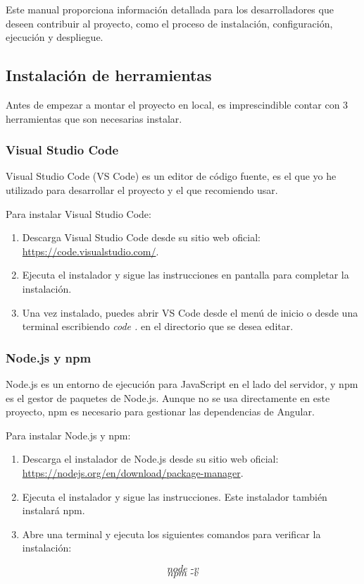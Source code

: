 Este manual proporciona información detallada para los desarrolladores que deseen contribuir al proyecto, como el proceso de instalación, configuración, ejecución y despliegue.

\subsection{Instalación de herramientas}

Antes de empezar a montar el proyecto en local, es imprescindible contar con 3 herramientas que son necesarias instalar.

\subsubsection{Visual Studio Code}
Visual Studio Code (VS Code) es un editor de código fuente, es el que yo he utilizado para desarrollar el proyecto y el que recomiendo usar.

Para instalar Visual Studio Code:
\begin{enumerate}
    \item Descarga Visual Studio Code desde su sitio web oficial: \url{https://code.visualstudio.com/}.
    \item Ejecuta el instalador y sigue las instrucciones en pantalla para completar la instalación.
    \item Una vez instalado, puedes abrir VS Code desde el menú de inicio o desde una terminal escribiendo \textit{code .} en el directorio que se desea editar.
\end{enumerate}

\subsubsection{Node.js y npm}
Node.js es un entorno de ejecución para JavaScript en el lado del servidor, y npm es el gestor de paquetes de Node.js. Aunque no se usa directamente en este proyecto, npm es necesario para gestionar las dependencias de Angular.

Para instalar Node.js y npm:
\begin{enumerate}
    \item Descarga el instalador de Node.js desde su sitio web oficial: \url{https://nodejs.org/en/download/package-manager}.
    \item Ejecuta el instalador y sigue las instrucciones. Este instalador también instalará npm.
    \item Abre una terminal y ejecuta los siguientes comandos para verificar la instalación:
\end{enumerate}
$$ \textit{node -v} $$
$$ \textit{npm -v} $$

